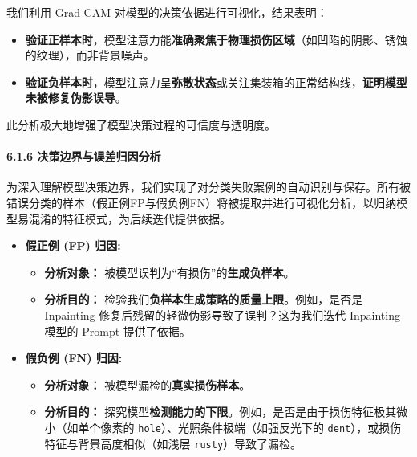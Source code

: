 \documentclass[
]{article}
\begin{document}
我们利用 Grad-CAM 对模型的决策依据进行可视化，结果表明：

\begin{itemize}
\item
  \textbf{验证正样本时}，模型注意力能\textbf{准确聚焦于物理损伤区域}（如凹陷的阴影、锈蚀的纹理），而非背景噪声。
\item
  \textbf{验证负样本时}，模型注意力呈\textbf{弥散状态}或关注集装箱的正常结构线，\textbf{证明模型未被修复伪影误导}。
\end{itemize}

此分析极大地增强了模型决策过程的可信度与透明度。

\paragraph{\texorpdfstring{\textbf{6.1.6
决策边界与误差归因分析}}{6.1.6 决策边界与误差归因分析}}\label{616-ux51b3ux7b56ux8fb9ux754cux4e0eux8befux5deeux5f52ux56e0ux5206ux6790}

为深入理解模型决策边界，我们实现了对分类失败案例的自动识别与保存。所有被错误分类的样本（假正例FP与假负例FN）将被提取并进行可视化分析，以归纳模型易混淆的特征模式，为后续迭代提供依据。

\begin{itemize}
\item
  \textbf{假正例 (FP) 归因:}

  \begin{itemize}
  \item
    \textbf{分析对象：} 被模型误判为``有损伤''的\textbf{生成负样本}。
  \item
    \textbf{分析目的：}
    检验我们\textbf{负样本生成策略的质量上限}。例如，是否是 Inpainting
    修复后残留的轻微伪影导致了误判？这为我们迭代 Inpainting 模型的
    Prompt 提供了依据。
  \end{itemize}
\item
  \textbf{假负例 (FN) 归因:}

  \begin{itemize}
  \item
    \textbf{分析对象：} 被模型漏检的\textbf{真实损伤样本}。
  \item
    \textbf{分析目的：}
    探究模型\textbf{检测能力的下限}。例如，是否是由于损伤特征极其微小（如单个像素的
    \texttt{hole}）、光照条件极端（如强反光下的
    \texttt{dent}），或损伤特征与背景高度相似（如浅层
    \texttt{rusty}）导致了漏检。
  \end{itemize}
\end{itemize}
\end{document}

